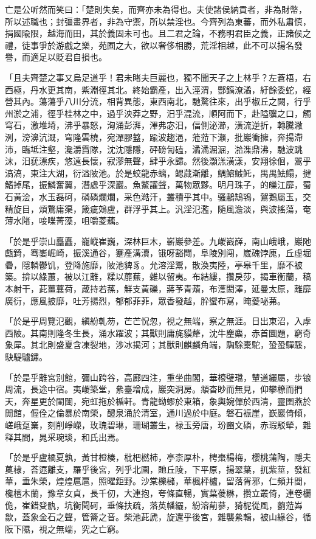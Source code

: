 \begin{pinyinscope}
亡是公听然而笑曰：「楚則失矣，而齊亦未為得也。夫使諸侯納貢者，非為財幣，所以述職也；封彊畫界者，非為守禦，所以禁淫也。今齊列為東蕃，而外私肅慎，捐國隃限，越海而田，其於義固未可也。且二君之論，不務明君臣之義，正諸侯之禮，徒事爭於游戲之樂，苑囿之大，欲以奢侈相勝，荒淫相越，此不可以揚名發譽，而適足以貶君自損也。

「且夫齊楚之事又烏足道乎！君未睹夫巨麗也，獨不聞天子之上林乎？左蒼梧，右西極，丹水更其南，紫淵徑其北。終始霸產，出入涇渭，酆鎬潦潏，紆餘委蛇，經營其內。蕩蕩乎八川分流，相背異態，東西南北，馳騖往來，出乎椒丘之闕，行乎州淤之浦，徑乎桂林之中，過乎泱莽之野，汨乎混流，順阿而下，赴隘骥之口，觸穹石，激堆埼，沸乎暴怒，洶涌彭湃，滭弗宓汨，偪側泌瀄，潢流逆折，轉騰潎洌，滂濞沆溉，穹隆雲橈，宛潬膠盭，踰波趨浥，蒞蒞下瀨，批巖衝擁，奔揚滯沛，臨坻注壑，瀺灂霣隊，沈沈隱隱，砰磅訇磕，潏潏淈淈，湁潗鼎沸，馳波跳沫，汨莸漂疾，悠遠長懷，寂漻無聲，肆乎永歸。然後灝溔潢漾，安翔徐佪，翯乎滈滈，東注大湖，衍溢陂池。於是蛟龍赤螭，鳃蒇漸離，鰅鰫鰬魠，禺禺魼鰨，揵鰭掉尾，振鱗奮翼，潛處乎深巖。魚鱉讙聲，萬物眾夥。明月珠子，的皪江靡，蜀石黃浍，水玉磊砢，磷磷爛爛，采色澔汗，叢積乎其中。骚鷫鵠鴇，鴐鵝屬玉，交精旋目，煩鶩庸渠，箴疵鵁盧，群浮乎其上。汎淫氾濫，隨風澹淡，與波搖蕩，奄薄水陼，唼喋菁藻，咀嚼菱藕。

「於是乎崇山矗矗，巃嵷崔巍，深林巨木，嶄巖參差。九嵕巀嶭，南山峨峨，巖阤甗錡，骞崣崛崎，振溪通谷，蹇產溝瀆，锇呀豁閜，阜陵別闯，崴磈饽廆，丘虛堀礨，隱轔鬱饥，登降施靡，陂池貏豸。允溶淫鬻，散渙夷陸，亭皋千里，靡不被築。揜以綠蕙，被以江離，糅以蘼蕪，雜以留夷。布結縷，攢戾莎，揭車衡蘭，稿本射干，茈薑蘘荷，葴持若蓀，鮮支黃礫，蔣芧青薠，布濩閎澤，延曼太原，離靡廣衍，應風披靡，吐芳揚烈，郁郁菲菲，眾香發越，肸蠁布寫，晻薆咇茀。

「於是乎周覽氾觀，縝紛軋芴，芒芒怳忽，視之無端，察之無涯。日出東沼，入虖西陂。其南則隆冬生長，涌水躍波；其獸則庸旄貘犛，沈牛麈麋，赤首圜題，窮奇象犀。其北則盛夏含凍裂地，涉冰揭河；其獸則麒麟角端，騊駼橐駝，蛩蛩驒騱，駃騠驢鏽。

「於是乎離宮別館，彌山跨谷，高廊四注，重坐曲閣，華榱璧璫，輦道纚屬，步锒周流，長途中宿。夷嵕築堂，絫臺增成，巖突洞房。頫杳眇而無見，仰攀橑而捫天，奔星更於閨闥，宛虹拖於楯軒。青龍蚴蟉於東箱，象輿婉僤於西清，靈圉燕於閒館，偓佺之倫暴於南榮，醴泉涌於清室，通川過於中庭。磐石裖崖，嶔巖倚傾，嵯峨趸嶪，刻削崢嶸，玫瑰碧琳，珊瑚叢生，禄玉旁唐，玢豳文磷，赤瑕駁犖，雜释其間，晁采琬琰，和氏出焉。

「於是乎盧橘夏孰，黃甘橙楱，枇杷橪柿，亭柰厚朴，梬棗楊梅，櫻桃蒲陶，隱夫薁棣，荅遝離支，羅乎後宮，列乎北園，貤丘陵，下平原，揚翠葉，扤紫莖，發紅華，垂朱榮，煌煌扈扈，照曜鉅野。沙棠櫟櫧，華楓枰櫨，留落胥邪，仁頻并閭，欃檀木蘭，豫章女貞，長千仞，大連抱，夸條直暢，實葉葰楙，攢立叢倚，連卷欐佹，崔錯癹骫，坑衡閜砢，垂條扶疏，落英幡纚，紛溶萷蔘，猗柅從風，藰蒞芔歙，蓋象金石之聲，管籥之音。柴池茈虒，旋還乎後宮，雜襲絫輯，被山緣谷，循阪下隰，視之無端，究之亡窮。


\end{pinyinscope}
